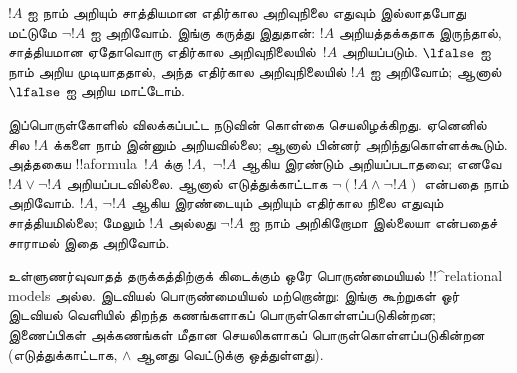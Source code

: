 \documentclass[../../../include/open-logic-section]{subfiles}
\begin{document}
$!A$ ஐ நாம் அறியும் சாத்தியமான எதிர்கால அறிவுநிலை எதுவும் இல்லாதபோது
மட்டுமே $\lnot !A$ ஐ அறிவோம். இங்கு கருத்து இதுதான்: $!A$ அறியத்தக்கதாக
இருந்தால், சாத்தியமான ஏதோவொரு எதிர்கால அறிவுநிலையில்~$!A$ அறியப்படும்.
$\lfalse$ ஐ நாம் அறிய முடியாததால், அந்த எதிர்கால அறிவுநிலையில் $!A$ ஐ
அறிவோம்; ஆனால்~$\lfalse$ ஐ அறிய மாட்டோம்.

இப்பொருள்கோளில் விலக்கப்பட்ட நடுவின் கொள்கை செயலிழக்கிறது. ஏனெனில் சில
$!A$ க்களை நாம் இன்னும் அறியவில்லை; ஆனால் பின்னர் அறிந்துகொள்ளக்கூடும்.
அத்தகைய !!a{formula}~$!A$ க்கு $!A$,~$\lnot !A$ ஆகிய இரண்டும்
அறியப்படாதவை; எனவே $!A \lor \lnot !A$ அறியப்படவில்லை. ஆனால்
எடுத்துக்காட்டாக $\lnot(!A \land \lnot !A)$ என்பதை நாம் அறிவோம். $!A$,
$\lnot !A$ ஆகிய இரண்டையும் அறியும் எதிர்கால நிலை எதுவும் சாத்தியமில்லை;
மேலும் $!A$ அல்லது $\lnot !A$ ஐ நாம் அறிகிறோமா இல்லையா என்பதைச் சாராமல்
இதை அறிவோம்.

உள்ளுணர்வுவாதத் தருக்கத்திற்குக் கிடைக்கும் ஒரே பொருண்மையியல்
!!^{relational model}s அல்ல. இடவியல் பொருண்மையியல் மற்றொன்று: இங்கு
கூற்றுகள் ஓர் இடவியல் வெளியில் திறந்த கணங்களாகப் பொருள்கொள்ளப்படுகின்றன;
இணைப்பிகள் அக்கணங்கள் மீதான செயலிகளாகப் பொருள்கொள்ளப்படுகின்றன
(எடுத்துக்காட்டாக, $\land$ ஆனது வெட்டுக்கு ஒத்துள்ளது).
\end{document}
